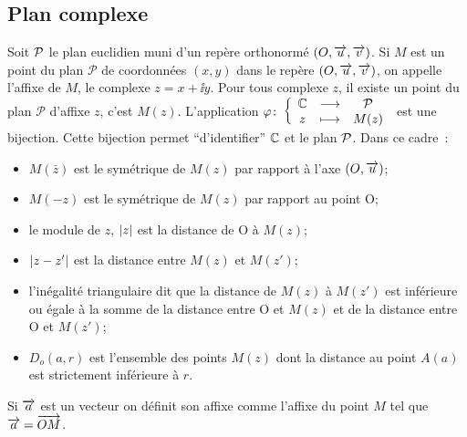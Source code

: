 \subsection{Plan complexe}
\label{subsec:plancomplexe}
%
Soit \(\P\) le plan euclidien muni d'un repère orthonormé \((O,\vect{u}, \vect{v})\). Si \(M\) est un point du plan \(\mathcal{P}\) de coordonnées \((x,y)\) dans le repère \((O,\vect{u}, \vect{v})\), on appelle l'affixe de \(M\), le complexe \(z=x + \ii y\). Pour tous complexe \(z\), il existe un point du plan \(\mathcal{P}\) d'affixe \(z\), c'est \(M(z)\). L'application \(\fonction{\varphi}{\C}{\P}{z}{M(z)}\) est une bijection. Cette bijection permet ``d'identifier'' \(\C\) et le plan \(\P\). Dans ce cadre~:
\begin{itemize}
\item \(M(\bar{z})\) est le symétrique de \(M(z)\) par rapport à l'axe \((O,\vect{u})\);
\item \(M(-z)\) est le symétrique de \(M(z)\) par rapport au point O;
\item le module de \(z\), \(\abs{z}\) est la distance de O à \(M(z)\);
\item \(\abs{z-z'}\) est la distance entre \(M(z)\) et \(M(z')\);
\item l'inégalité triangulaire dit que la distance de \(M(z)\) à \(M(z')\) est inférieure ou égale à la somme de la distance entre O et \(M(z)\) et de la distance entre O et \(M(z')\);
\item \(D_o(a,r)\) est l'ensemble des points \(M(z)\) dont la distance au point \(A(a)\) est strictement inférieure à \(r\).
\end{itemize}
Si \(\vect{a}\) est un vecteur on définit son affixe comme l'affixe du point \(M\) tel que \(\vect{a}=\vect{OM}\).




